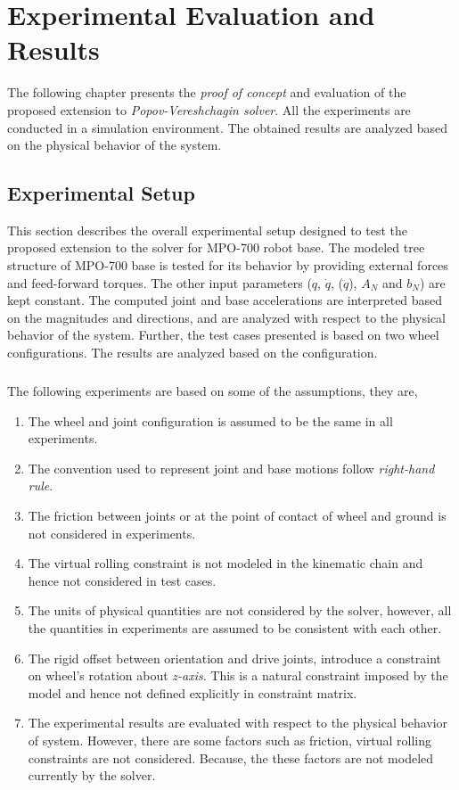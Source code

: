 
\chapter{Experimental Evaluation and Results}\label{chap:experiment}

The following chapter presents the \textit{proof of concept} and evaluation of the proposed extension to \textit{Popov-Vereshchagin solver}. All the experiments are conducted in a simulation environment. The obtained results are analyzed based on the physical behavior of the system. 


\section{Experimental Setup}
This section describes the overall experimental setup designed to test the proposed extension to the solver for MPO-700 robot base. The modeled tree structure of MPO-700 base is tested for its behavior by providing external forces and feed-forward torques.  The other input parameters ($q$, $\dot{q}$, ($\ddot{q}$), $A_N$ and $b_N$) are kept constant. The computed joint and base accelerations are interpreted based on the magnitudes and directions, and are analyzed with respect to the physical behavior of the system. Further, the test cases presented is based on two wheel configurations. The results are analyzed based on the configuration.  


\paragraph{}The following experiments are based on some of the assumptions, they are,

\begin{enumerate}
	\item The wheel and joint configuration is assumed to be the same in all experiments.  
	\item The convention used to represent joint and base motions follow \textit{right-hand rule}.
	\item The friction between joints or at the point of contact of wheel and ground is not considered in experiments.
	\item The virtual rolling constraint is not modeled in the kinematic chain and hence not considered in test cases.
	\item The units of physical quantities are not considered by the solver, however, all the quantities in experiments are assumed to be consistent with each other.
	\item The rigid offset between orientation and drive joints, introduce a constraint on wheel's rotation about \textit{z-axis}. This is a natural constraint imposed by the model and hence not defined explicitly in constraint matrix.
	\item The experimental results are evaluated with respect to the physical behavior of system. However, there are some factors such as friction, virtual rolling constraints are not considered. Because, the these factors are not modeled currently by the solver.
\end{enumerate}


